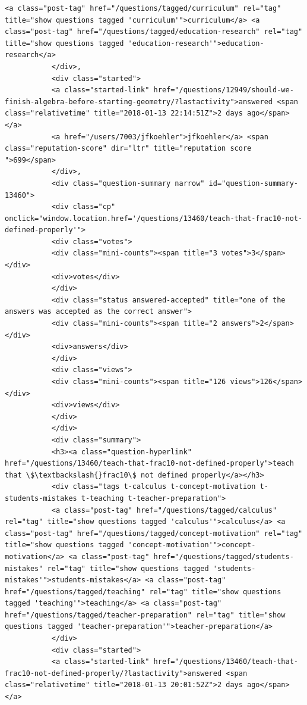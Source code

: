 \documentclass[11pt]{article}
\begin{document}
\begin{Verbatim}[commandchars=\\\{\}]
           <a class="post-tag" href="/questions/tagged/curriculum" rel="tag" title="show questions tagged 'curriculum'">curriculum</a> <a class="post-tag" href="/questions/tagged/education-research" rel="tag" title="show questions tagged 'education-research'">education-research</a>
           </div>,
           <div class="started">
           <a class="started-link" href="/questions/12949/should-we-finish-algebra-before-starting-geometry/?lastactivity">answered <span class="relativetime" title="2018-01-13 22:14:51Z">2 days ago</span></a>
           <a href="/users/7003/jfkoehler">jfkoehler</a> <span class="reputation-score" dir="ltr" title="reputation score ">699</span>
           </div>,
           <div class="question-summary narrow" id="question-summary-13460">
           <div class="cp" onclick="window.location.href='/questions/13460/teach-that-frac10-not-defined-properly'">
           <div class="votes">
           <div class="mini-counts"><span title="3 votes">3</span></div>
           <div>votes</div>
           </div>
           <div class="status answered-accepted" title="one of the answers was accepted as the correct answer">
           <div class="mini-counts"><span title="2 answers">2</span></div>
           <div>answers</div>
           </div>
           <div class="views">
           <div class="mini-counts"><span title="126 views">126</span></div>
           <div>views</div>
           </div>
           </div>
           <div class="summary">
           <h3><a class="question-hyperlink" href="/questions/13460/teach-that-frac10-not-defined-properly">teach that \$\textbackslash{}frac10\$ not defined properly</a></h3>
           <div class="tags t-calculus t-concept-motivation t-students-mistakes t-teaching t-teacher-preparation">
           <a class="post-tag" href="/questions/tagged/calculus" rel="tag" title="show questions tagged 'calculus'">calculus</a> <a class="post-tag" href="/questions/tagged/concept-motivation" rel="tag" title="show questions tagged 'concept-motivation'">concept-motivation</a> <a class="post-tag" href="/questions/tagged/students-mistakes" rel="tag" title="show questions tagged 'students-mistakes'">students-mistakes</a> <a class="post-tag" href="/questions/tagged/teaching" rel="tag" title="show questions tagged 'teaching'">teaching</a> <a class="post-tag" href="/questions/tagged/teacher-preparation" rel="tag" title="show questions tagged 'teacher-preparation'">teacher-preparation</a>
           </div>
           <div class="started">
           <a class="started-link" href="/questions/13460/teach-that-frac10-not-defined-properly/?lastactivity">answered <span class="relativetime" title="2018-01-13 20:01:52Z">2 days ago</span></a>

\end{Verbatim}
\end{document}
